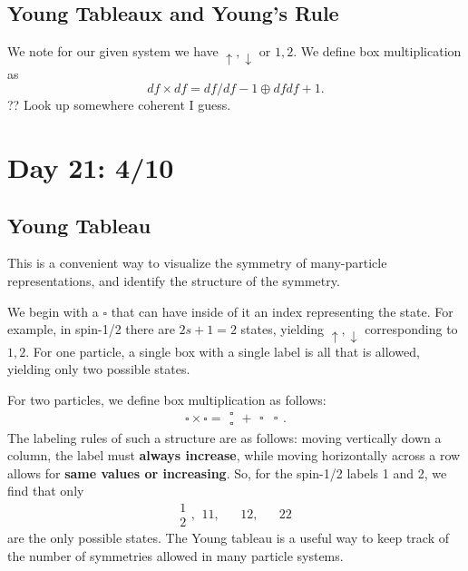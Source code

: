 \documentclass[fontsize=12pt]{scrartcl}
\begin{document}
\subsection{Young Tableaux and Young's Rule}

We note for our given system we have $\boxed{\uparrow}, \boxed{\downarrow}$ or $\boxed{1}, \boxed{2}$. We define box multiplication as $$\boxed{df}\times\boxed{df} = \boxed{df}/\boxed{df-1} \oplus \boxed{df}\boxed{df+1}.$$
?? Look up somewhere coherent I guess.


\section{Day 21: 4/10}

\subsection{Young Tableau}

This is a convenient way to visualize the symmetry of many-particle representations, and identify the structure of the symmetry.

We begin with a $\square$ that can have inside of it an index representing the state. For example, in spin-1/2 there are $2s+1=2$ states, yielding $\boxed{\uparrow},\boxed{\downarrow}$ corresponding to $\boxed{1},\boxed{2}$. For one particle, a single box with a single label is all that is allowed, yielding only two possible states.

For two particles, we define box multiplication as follows: $$\square\times\square = \begin{matrix}
\square \\ \square
\end{matrix} + \begin{matrix}
\square & \square
\end{matrix}.$$ The labeling rules of such a structure are as follows: moving vertically down a column, the label must \textbf{always increase}, while moving horizontally across a row allows for \textbf{same values or increasing}. So, for the spin-1/2 labels 1 and 2, we find that only $$\begin{matrix}
\boxed{1}\\\boxed{2}
\end{matrix}, \begin{matrix}
\boxed{1}\boxed{1}, & & \boxed{1}\boxed{2}, & & \boxed{2}\boxed{2}
\end{matrix}$$ are the only possible states. The Young tableau is a useful way to keep track of the number of symmetries allowed in many particle systems.
\end{document}
